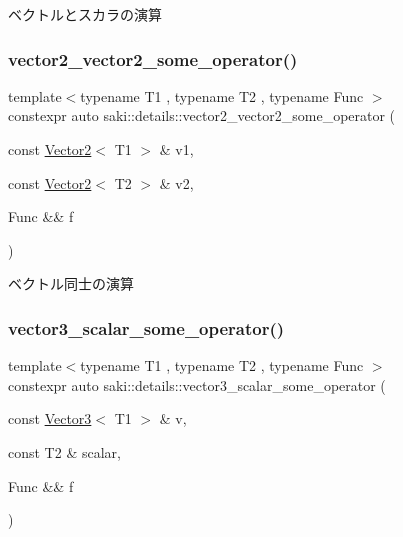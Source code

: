 ベクトルとスカラの演算 

\mbox{\label{namespacesaki_1_1details_a1e3ab5ffafb707dc8d8b3cf054f3b2e3}} 
\subsubsection{\texorpdfstring{vector2\+\_\+vector2\+\_\+some\+\_\+operator()}{vector2\_vector2\_some\_operator()}}
{\footnotesize\ttfamily template$<$typename T1 , typename T2 , typename Func $>$ \\
constexpr auto saki\+::details\+::vector2\+\_\+vector2\+\_\+some\+\_\+operator (\begin{DoxyParamCaption}\item[{const \mbox{\hyperlink{classsaki_1_1_vector2}{Vector2}}$<$ T1 $>$ \&}]{v1,  }\item[{const \mbox{\hyperlink{classsaki_1_1_vector2}{Vector2}}$<$ T2 $>$ \&}]{v2,  }\item[{Func \&\&}]{f }\end{DoxyParamCaption})}



ベクトル同士の演算 

\mbox{\label{namespacesaki_1_1details_a65a656e3fd6cb4f45afc9137f5e6383a}} 
\subsubsection{\texorpdfstring{vector3\+\_\+scalar\+\_\+some\+\_\+operator()}{vector3\_scalar\_some\_operator()}}
{\footnotesize\ttfamily template$<$typename T1 , typename T2 , typename Func $>$ \\
constexpr auto saki\+::details\+::vector3\+\_\+scalar\+\_\+some\+\_\+operator (\begin{DoxyParamCaption}\item[{const \mbox{\hyperlink{classsaki_1_1_vector3}{Vector3}}$<$ T1 $>$ \&}]{v,  }\item[{const T2 \&}]{scalar,  }\item[{Func \&\&}]{f }\end{DoxyParamCaption})}



